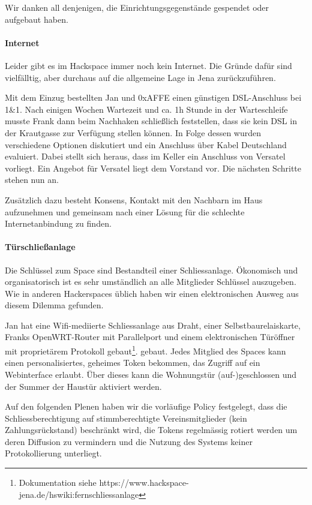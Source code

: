 \documentclass[10pt,DIV16]{scrartcl}
\begin{document}
Wir danken all denjenigen, die Einrichtungsgegenstände gespendet oder
aufgebaut haben. 

\paragraph{Internet}

Leider gibt es im Hackspace immer noch kein Internet. Die Gründe
dafür sind vielfälltig, aber durchaus auf die allgemeine Lage in
Jena zurückzuführen.

Mit dem Einzug bestellten Jan und 0xAFFE einen günstigen
DSL-Anschluss bei 1\&1. Nach einigen Wochen Wartezeit und ca. 1h
Stunde in der Warteschleife musste Frank dann beim Nachhaken
schließlich feststellen, dass sie kein DSL in der Krautgasse zur
Verfügung stellen können. In Folge dessen wurden verschiedene
Optionen diskutiert und ein Anschluss über Kabel Deutschland
evaluiert. Dabei stellt sich heraus, dass im Keller ein Anschluss
von Versatel vorliegt. Ein Angebot für Versatel liegt dem Vorstand
vor. Die nächsten Schritte stehen nun an.

Zusätzlich dazu besteht Konsens, Kontakt mit den Nachbarn im Haus
aufzunehmen und gemeinsam nach einer Lösung für die schlechte
Internetanbindung zu finden.

\paragraph{Türschließanlage}

Die Schl\"ussel zum Space sind Bestandteil einer
Schliessanlage. \"Okonomisch und organisatorisch ist es sehr
umst\"andlich an alle Mitglieder Schl\"ussel auszugeben. Wie in
anderen Hackerspaces \"ublich haben wir einen elektronischen Ausweg
aus diesem Dilemma gefunden.

Jan hat eine Wifi-mediierte Schliessanlage aus Draht, einer
Selbstbaurelaiskarte, Franks OpenWRT-Router mit Parallelport und einem
elektronischen T\"ur\"offner mit propriet\"arem Protokoll
gebaut\footnote{Dokumentation siehe
  https://www.hackspace-jena.de/hswiki:fernschliessanlage}.
gebaut. Jedes Mitglied des Spaces kann einen personalisiertes,
geheimes Token bekommen, das Zugriff auf ein Webinterface
erlaubt. \"Uber dieses kann die Wohnungst\"ur (auf-)geschlossen und der
Summer der Haust\"ur aktiviert werden.

Auf den folgenden Plenen haben wir die vorl\"aufige Policy festgelegt,
dass die Schliessberechtigung auf stimmberechtigte Vereinsmitglieder
(kein Zahlungsr\"uckstand) beschr\"ankt wird, die Tokens regelm\"assig
rotiert werden um deren Diffusion zu vermindern und die Nutzung des
Systems keiner Protokollierung unterliegt.
\end{document}
